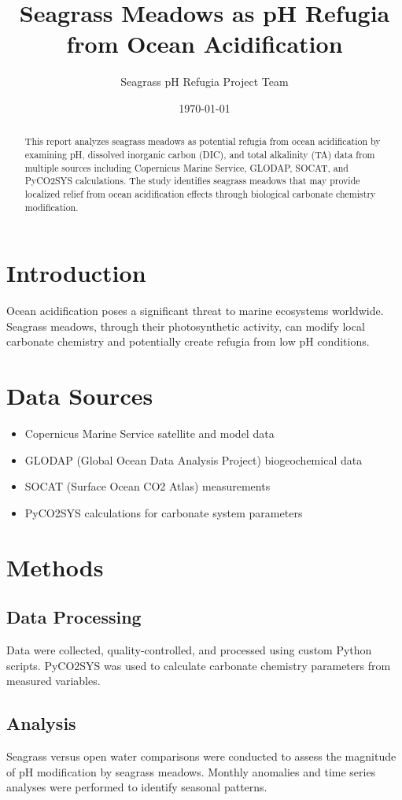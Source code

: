 \documentclass[12pt]{article}
\title{Seagrass Meadows as pH Refugia from Ocean Acidification}
\author{Seagrass pH Refugia Project Team}
\date{\today}
\begin{document}
\maketitle

\begin{abstract}
This report analyzes seagrass meadows as potential refugia from ocean acidification
by examining pH, dissolved inorganic carbon (DIC), and total alkalinity (TA) data
from multiple sources including Copernicus Marine Service, GLODAP, SOCAT, and
PyCO2SYS calculations. The study identifies seagrass meadows that may provide
localized relief from ocean acidification effects through biological carbonate
chemistry modification.
\end{abstract}

\section{Introduction}
Ocean acidification poses a significant threat to marine ecosystems worldwide.
Seagrass meadows, through their photosynthetic activity, can modify local
carbonate chemistry and potentially create refugia from low pH conditions.

\section{Data Sources}
\begin{itemize}
    \item Copernicus Marine Service satellite and model data
    \item GLODAP (Global Ocean Data Analysis Project) biogeochemical data
    \item SOCAT (Surface Ocean CO2 Atlas) measurements
    \item PyCO2SYS calculations for carbonate system parameters
\end{itemize}

\section{Methods}
\subsection{Data Processing}
Data were collected, quality-controlled, and processed using custom Python scripts.
PyCO2SYS was used to calculate carbonate chemistry parameters from measured
variables.

\subsection{Analysis}
Seagrass versus open water comparisons were conducted to assess the magnitude
of pH modification by seagrass meadows. Monthly anomalies and time series
analyses were performed to identify seasonal patterns.
\end{document}
